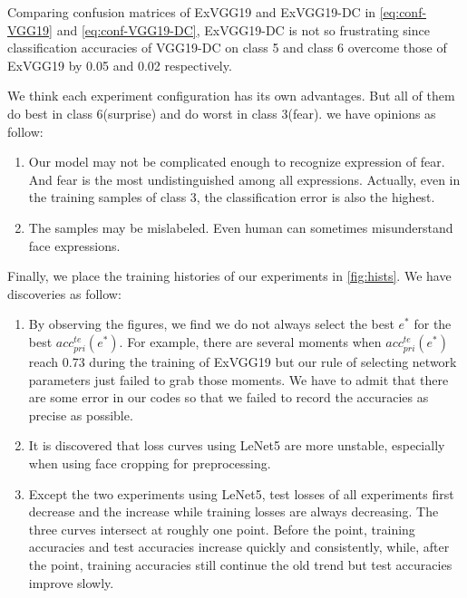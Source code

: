 \documentclass[journal, onecolumn]{IEEEtran}
\begin{document}
Comparing confusion matrices of ExVGG19 and ExVGG19-DC in \ref{eq:conf-VGG19} and \ref{eq:conf-VGG19-DC}, ExVGG19-DC is not so frustrating since classification accuracies of VGG19-DC on class 5 and class 6 overcome those of ExVGG19 by 0.05 and 0.02 respectively. 

We think each experiment configuration has its own advantages. But all of them do best in class 6(surprise) and do worst in class 3(fear). we have opinions as follow:
\begin{enumerate}
  \item Our model may not be complicated enough to recognize expression of fear. And fear is the most undistinguished among all expressions. Actually, even in the training samples of class 3, the classification error is also the highest.
  \item The samples may be mislabeled. Even human can sometimes misunderstand face expressions.
\end{enumerate}

Finally, we place the training histories of our experiments in \ref{fig:hists}. We have discoveries as follow:
\begin{enumerate}
  \item  By observing the figures, we find we do not always select the best $e^*$ for the best $acc^{te}_{pri}(e^*)$. For example, there are several moments when $acc^{te}_{pri}(e^*)$ reach 0.73 during the training of ExVGG19 but our rule of selecting network parameters just failed to grab those moments. We have to admit that there are some error in our codes so that we failed to record the accuracies as precise as possible.
  \item It is discovered that loss curves using LeNet5 are more unstable, especially when using face cropping for preprocessing. 
  \item Except the two experiments using LeNet5, test losses of all experiments first decrease and the increase while training losses are always decreasing. The three curves intersect at roughly one point. Before the point, training accuracies and test accuracies increase quickly and consistently, while, after the point, training accuracies still continue the old trend but test accuracies improve slowly.
\end{enumerate}
  
\end{document}
